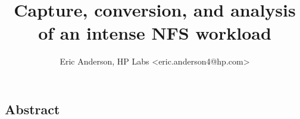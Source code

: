 \documentclass[twocolumn, 10pt]{article}
\begin{document}
\title{\Large \bf Capture, conversion, and analysis of an intense NFS workload}

\author{Eric Anderson, HP Labs <eric.anderson4@hp.com>}
\date{}
\maketitle



\subsection*{Abstract}









\end{document}
